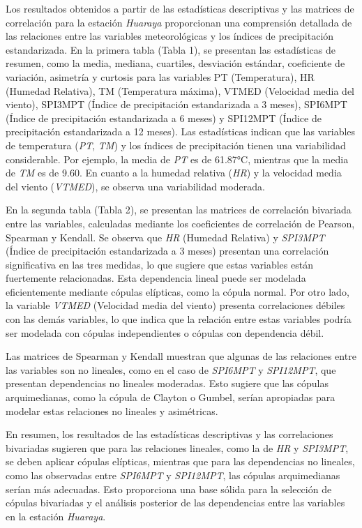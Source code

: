 \begin{figure}[htbp]
\end{figure}

Los resultados obtenidos a partir de las estadísticas descriptivas y las matrices de correlación para la estación \textit{Huaraya} proporcionan una comprensión detallada de las relaciones entre las variables meteorológicas y los índices de precipitación estandarizada. En la primera tabla (Tabla 1), se presentan las estadísticas de resumen, como la media, mediana, cuartiles, desviación estándar, coeficiente de variación, asimetría y curtosis para las variables PT (Temperatura), HR (Humedad Relativa), TM (Temperatura máxima), VTMED (Velocidad media del viento), SPI3MPT (Índice de precipitación estandarizada a 3 meses), SPI6MPT (Índice de precipitación estandarizada a 6 meses) y SPI12MPT (Índice de precipitación estandarizada a 12 meses). Las estadísticas indican que las variables de temperatura (\textit{PT}, \textit{TM}) y los índices de precipitación tienen una variabilidad considerable. Por ejemplo, la media de \textit{PT} es de 61.87°C, mientras que la media de \textit{TM} es de 9.60. En cuanto a la humedad relativa (\textit{HR}) y la velocidad media del viento (\textit{VTMED}), se observa una variabilidad moderada.

En la segunda tabla (Tabla 2), se presentan las matrices de correlación bivariada entre las variables, calculadas mediante los coeficientes de correlación de Pearson, Spearman y Kendall. Se observa que \textit{HR} (Humedad Relativa) y \textit{SPI3MPT} (Índice de precipitación estandarizada a 3 meses) presentan una correlación significativa en las tres medidas, lo que sugiere que estas variables están fuertemente relacionadas. Esta dependencia lineal puede ser modelada eficientemente mediante cópulas elípticas, como la cópula normal. Por otro lado, la variable \textit{VTMED} (Velocidad media del viento) presenta correlaciones débiles con las demás variables, lo que indica que la relación entre estas variables podría ser modelada con cópulas independientes o cópulas con dependencia débil.

Las matrices de Spearman y Kendall muestran que algunas de las relaciones entre las variables son no lineales, como en el caso de \textit{SPI6MPT} y \textit{SPI12MPT}, que presentan dependencias no lineales moderadas. Esto sugiere que las cópulas arquimedianas, como la cópula de Clayton o Gumbel, serían apropiadas para modelar estas relaciones no lineales y asimétricas.

En resumen, los resultados de las estadísticas descriptivas y las correlaciones bivariadas sugieren que para las relaciones lineales, como la de \textit{HR} y \textit{SPI3MPT}, se deben aplicar cópulas elípticas, mientras que para las dependencias no lineales, como las observadas entre \textit{SPI6MPT} y \textit{SPI12MPT}, las cópulas arquimedianas serían más adecuadas. Esto proporciona una base sólida para la selección de cópulas bivariadas y el análisis posterior de las dependencias entre las variables en la estación \textit{Huaraya}.



